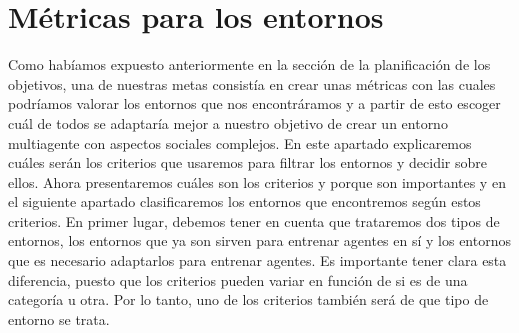 \section{Métricas para los entornos}
Como habíamos expuesto anteriormente en la sección de la planificación de los objetivos, una de nuestras metas consistía en crear unas métricas con las cuales podríamos valorar los entornos que nos encontráramos y a partir de esto escoger cuál de todos se adaptaría mejor a nuestro objetivo de crear un entorno multiagente con aspectos sociales complejos. En este apartado explicaremos cuáles serán los criterios que usaremos para filtrar los entornos y decidir sobre ellos. Ahora presentaremos cuáles son los criterios y porque son importantes y en el siguiente apartado clasificaremos los entornos que encontremos según estos criterios. En primer lugar, debemos tener en cuenta que trataremos dos tipos de entornos, los entornos que ya son sirven para entrenar agentes en sí y los entornos que es necesario adaptarlos para entrenar agentes. Es importante tener clara esta diferencia, puesto que los criterios pueden variar en función de si es de una categoría u otra. Por lo tanto, uno de los criterios también será de que tipo de entorno se trata.  

